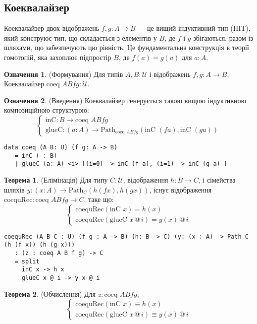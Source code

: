 \documentclass{article}
\theoremstyle{definition}
\newtheorem{theorem}{Теорема}
\newtheorem{definition}{Означення}
\begin{document}
\subsection{Коеквалайзер}
Коеквалайзер двох відображень \( f, g : A \to B \) — це вищий індуктивний
тип (HIT), який конструює тип, що складається з елементів у \( B \),
де \( f \) і \( g \) збігаються, разом із шляхами, що забезпечують цю рівність.
Це фундаментальна конструкція в теорії гомотопій,
яка захоплює підпростір \( B \), де \( f(a) = g(a) \) для \( a : A \).

\begin{definition} (Формування)
Для типів \( A, B : \mathcal{U} \) і відображень \( f, g : A \to B \),
Коеквалайзер \( \text{coeq } A B f g : \mathcal{U} \).
\end{definition}

\begin{definition} (Введення)
Коеквалайзер генерується такою вищою
індуктивною композиційною структурою:
\[
\begin{cases}
\text{inC} : B \to \text{coeq } A B f g \\
\text{glueC} : (a : A) \to \text{Path}_{\text{coeq } A B f g} (\text{inC } (f a), \text{inC } (g a))
\end{cases}
\]
\begin{lstlisting}
data coeq (A B: U) (f g: A -> B)
   = inC (_: B)
   | glueC (a: A) <i> [(i=0) -> inC (f a), (i=1) -> inC (g a) ]
\end{lstlisting}
\end{definition}

\begin{theorem} (Елімінація)
Для типу \( C : \mathcal{U} \), відображення \( h : B \to C \), і сімейства шляхів \( y : (x : A) \to \text{Path}_C (h (f x), h (g x)) \), існує відображення \( \text{coequRec} : \text{coeq } A B f g \to C \), таке що:
\[
\begin{cases}
\text{coequRec}(\text{inC } x) = h(x) \\
\text{coequRec}(\text{glueC } x \, @ \, i) = y(x) \, @ \, i
\end{cases}
\]
\begin{lstlisting}
coequRec (A B C : U) (f g : A -> B) (h: B -> C) (y: (x : A) -> Path C (h (f x)) (h (g x)))
   : (z : coeq A B f g) -> C
   = split
     inC x -> h x
     glueC x @ i -> y x @ i
\end{lstlisting}
\end{theorem}

\begin{theorem} (Обчислення)
Для \( z : \text{coeq } A B f g \),
\[
\begin{cases}
\text{coequRec}(\text{inC } x) \equiv h(x) \\
\text{coequRec}(\text{glueC } x \, @ \, i) \equiv y(x) \, @ \, i
\end{cases}
\]
\end{theorem}
\end{document}
